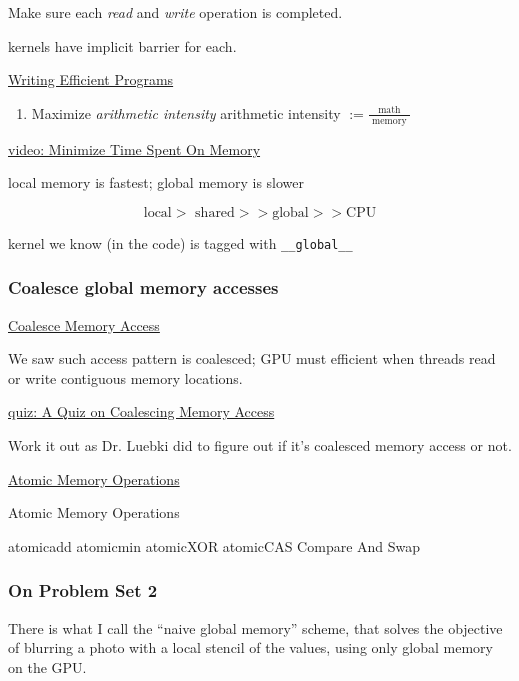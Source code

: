 \documentclass[10pt]{amsart}
\begin{document}
\begin{multicols*}{2}
Make sure each \emph{read} and \emph{write} operation is completed.  

kernels have implicit barrier for each.  

\href{https://classroom.udacity.com/courses/cs344/lessons/77202674/concepts/774332060923}{Writing Efficient Programs}

\begin{enumerate}
\item Maximize \emph{arithmetic intensity}
  arithmetic intensity $:= \frac{ \text{ math } }{ \text{ memory }}$
  \end{enumerate}

\href{https://classroom.udacity.com/courses/cs344/lessons/77202674/concepts/774332070923}{video: Minimize Time Spent On Memory}

local memory is fastest; global memory is slower

\[
\text{local} > \text{ shared} >> \text{global} >> \text{CPU}
\]

kernel we know (in the code) is tagged with \verb|__global__|




\subsubsection{Coalesce global memory accesses}

\href{https://classroom.udacity.com/courses/cs344/lessons/77202674/concepts/799933660923}{Coalesce Memory Access}

We saw such access pattern is coalesced; GPU must efficient when threads read or write contiguous memory locations.  


\href{https://classroom.udacity.com/courses/cs344/lessons/77202674/concepts/814086830923}{quiz: A Quiz on Coalescing Memory Access}

Work it out as Dr. Luebki did to figure out if it's coalesced memory access or not.  


\href{https://classroom.udacity.com/courses/cs344/lessons/77202674/concepts/774332150923}{Atomic Memory Operations}

Atomic Memory Operations

atomicadd atomicmin atomicXOR atomicCAS Compare And Swap


\subsubsection{On Problem Set 2}

There is what I call the ``naive global memory'' scheme, that solves the objective of blurring a photo with a local stencil of the values, using only global memory on the GPU.


\end{multicols*}
\end{document}
